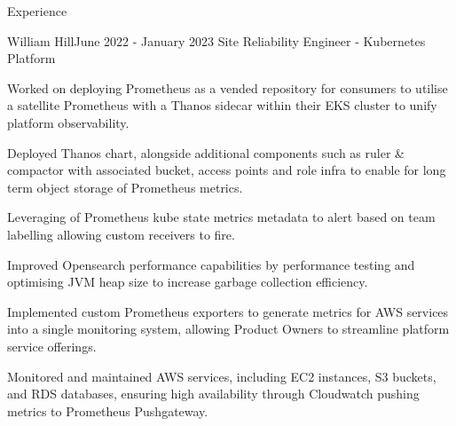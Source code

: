 \documentclass{resume} %
\begin{document}
\begin{rSection}{Experience}
\begin{rSubsection}{William Hill}{June 2022 - January 2023}
{Site Reliability Engineer - Kubernetes Platform}{}
\normalfont
\item Worked on deploying Prometheus as a vended repository for consumers to utilise a satellite Prometheus with a Thanos sidecar within their EKS cluster to unify platform observability. %
\item Deployed Thanos chart, alongside additional components such as ruler \& compactor with associated bucket, access points and role infra to enable for long term object storage of Prometheus metrics. %
\item Leveraging of Prometheus kube state metrics metadata to alert based on team labelling allowing custom receivers to fire. %
\item Improved Opensearch performance capabilities by performance testing and optimising JVM heap size to increase garbage collection efficiency. %
\item Implemented custom Prometheus exporters to generate metrics for AWS services into a single monitoring system, allowing Product Owners to streamline platform service offerings. %
\item Monitored and maintained AWS services, including EC2 instances, S3 buckets, and RDS databases, ensuring high availability through Cloudwatch pushing metrics to Prometheus Pushgateway. %
\normalfont

\end{rSubsection}


\end{rSection}
\end{document}
